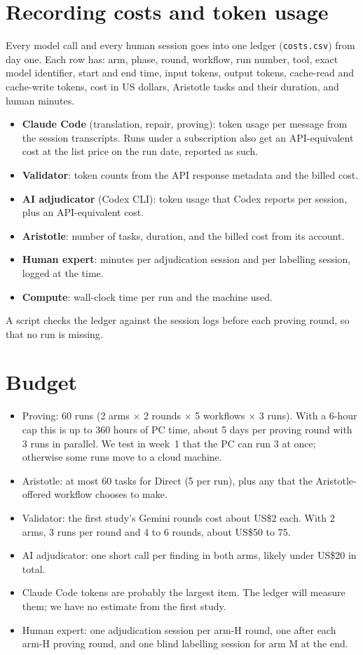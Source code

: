 \documentclass[11pt,a4paper]{article}
\newcommand{\code}[1]{\texttt{#1}}
\begin{document}
\section{Recording costs and token usage}
Every model call and every human session goes into one ledger (\code{costs.csv}) from day one. Each row has: arm, phase, round, workflow, run number, tool, exact model identifier, start and end time, input tokens, output tokens, cache-read and cache-write tokens, cost in US dollars, Aristotle tasks and their duration, and human minutes.
\begin{itemize}
\item \textbf{Claude Code} (translation, repair, proving): token usage per message from the session transcripts. Runs under a subscription also get an API-equivalent cost at the list price on the run date, reported as such.
\item \textbf{Validator}: token counts from the API response metadata and the billed cost.
\item \textbf{AI adjudicator} (Codex CLI): token usage that Codex reports per session, plus an API-equivalent cost.
\item \textbf{Aristotle}: number of tasks, duration, and the billed cost from its account.
\item \textbf{Human expert}: minutes per adjudication session and per labelling session, logged at the time.
\item \textbf{Compute}: wall-clock time per run and the machine used.
\end{itemize}
A script checks the ledger against the session logs before each proving round, so that no run is missing.

\section{Budget}
\begin{itemize}
\item Proving: 60 runs (2 arms $\times$ 2 rounds $\times$ 5 workflows $\times$ 3 runs). With a 6-hour cap this is up to 360 hours of PC time, about 5 days per proving round with 3 runs in parallel. We test in week~1 that the PC can run 3 at once; otherwise some runs move to a cloud machine.
\item Aristotle: at most 60 tasks for Direct (5 per run), plus any that the Aristotle-offered workflow chooses to make.
\item Validator: the first study's Gemini rounds cost about US\$2 each. With 2 arms, 3 runs per round and 4 to 6 rounds, about US\$50 to 75.
\item AI adjudicator: one short call per finding in both arms, likely under US\$20 in total.
\item Claude Code tokens are probably the largest item. The ledger will measure them; we have no estimate from the first study.
\item Human expert: one adjudication session per arm-H round, one after each arm-H proving round, and one blind labelling session for arm M at the end.
\end{itemize}
\end{document}
